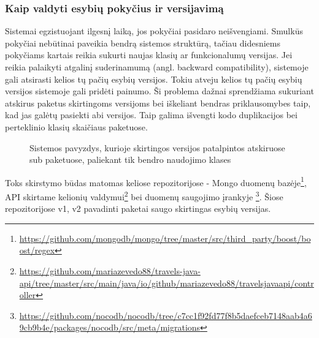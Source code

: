 \subsubsection{Kaip valdyti esybių pokyčius ir versijavimą}
Sistemai egzistuojant ilgesnį laiką, jos pokyčiai pasidaro neišvengiami. Smulkūs pokyčiai nebūtinai paveikia bendrą sistemos struktūrą, tačiau
didesniems pokyčiams kartais reikia sukurti naujas klasių ar funkcionalumų versijas. Jei reikia palaikyti atgalinį
suderinamumą (angl. backward compatibility), sistemoje gali atsirasti kelios tų pačių esybių versijos.
Tokiu atveju kelios tų pačių esybių versijos sistemoje gali pridėti painumo. Ši problema dažnai sprendžiama sukuriant atskirus paketus skirtingoms
versijoms bei iškeliant bendras priklausomybes taip, kad jas galėtų pasiekti abi versijos. Taip galima išvengti kodo duplikacijos bei perteklinio
klasių skaičiaus paketuose.
\begin{figure}[H]
    \snugshade
    \endsnugshade
    \caption{Sistemos pavyzdys, kurioje skirtingos versijos patalpintos atskiruose sub paketuose, paliekant tik bendro naudojimo klases}
\end{figure}
Toks skirstymo būdas matomas keliose repozitorijose - Mongo duomenų bazėje\footnote{\url{https://github.com/mongodb/mongo/tree/master/src/third_party/boost/boost/regex}},
API skirtame kelionių valdymui\footnote{\url{https://github.com/mariazevedo88/travels-java-api/tree/master/src/main/java/io/github/mariazevedo88/travelsjavaapi/controller}}
 bei duomenų saugojimo įrankyje \footnote{\url{https://github.com/nocodb/nocodb/tree/c7cc1f92fd77f8b5daefceb7148aab4a69cb9b4e/packages/nocodb/src/meta/migrations}}.
Šiose repozitorijose v1, v2 pavadinti paketai saugo skirtingas esybių versijas.